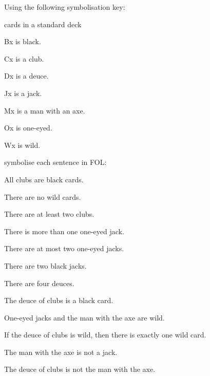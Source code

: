 \solutions
\problempart
\label{pr.FOLcards}
Using the following symbolisation key:
\begin{ekey}
\item[\text{domain}] cards in a standard deck
\item[Bx]  is black.
\item[Cx]  is a club.
\item[Dx]  is a deuce.
\item[Jx]  is a jack.
\item[Mx]  is a man with an axe.
\item[Ox]  is one-eyed.
\item[Wx]  is wild.
\end{ekey}
symbolise each sentence in FOL:
\begin{earg}
\item All clubs are black cards.
\item There are no wild cards.
\item There are at least two clubs.
\item There is more than one one-eyed jack.
\item There are at most two one-eyed jacks.
\item There are two black jacks.
\item There are four deuces.
\item The deuce of clubs is a black card.
\item One-eyed jacks and the man with the axe are wild.
\item If the deuce of clubs is wild, then there is exactly one wild card.
\item The man with the axe is not a jack.
\item The deuce of clubs is not the man with the axe.
\end{earg}

\

